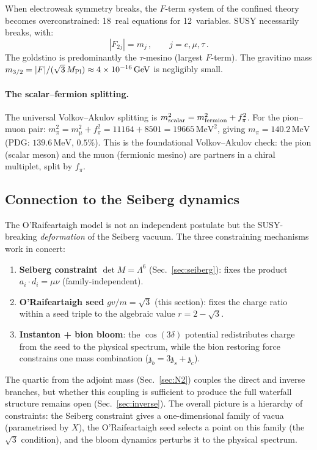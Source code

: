 \documentclass[aps,prd,twocolumn,showpacs,preprintnumbers,superscriptaddress,floatfix]{revtex4-2}
\newcommand{\MeV}{\,\mathrm{MeV}}
\newcommand{\GeV}{\,\mathrm{GeV}}
\newcommand{\zch}{\mathfrak{z}}
\begin{document}
When electroweak symmetry breaks, the $F$-term system of the
confined theory becomes overconstrained: 18~real equations for
12~variables.
SUSY necessarily breaks, with:
\begin{equation}
  |F_{2j}| = m_j\,,\qquad j = e, \mu, \tau\,.
  \label{eq:Fterms_leptons}
\end{equation}
The goldstino is predominantly the $\tau$-mesino (largest
$F$-term).
The gravitino mass
$m_{3/2} = |F|/(\sqrt{3}\,M_{\rm Pl})
\approx 4 \times 10^{-16}\GeV$
is negligibly small.

\paragraph{The scalar--fermion splitting.}
The universal Volkov--Akulov splitting is
$m^2_{\rm scalar} = m^2_{\rm fermion} + f_\pi^2$.
For the pion--muon pair:
$m_\pi^2 = m_\mu^2 + f_\pi^2 = 11164 + 8501 = 19665\MeV^2$,
giving $m_\pi = 140.2\MeV$ (PDG: $139.6\MeV$, $0.5\%$).
This is the foundational Volkov--Akulov check: the pion (scalar
meson) and the muon (fermionic mesino) are partners in a chiral
multiplet, split by $f_\pi$.


\subsection{Connection to the Seiberg dynamics}

The O'Raifeartaigh model is not an independent postulate but the
SUSY-breaking \emph{deformation} of the Seiberg vacuum.
The three constraining mechanisms work in concert:
\begin{enumerate}
  \item \textbf{Seiberg constraint} $\det M = \Lambda^6$
    (Sec.~\ref{sec:seiberg}): fixes the product
    $a_i \cdot d_i = \mu\nu$ (family-independent).
  \item \textbf{O'Raifeartaigh seed} $gv/m = \sqrt{3}$
    (this section): fixes the charge ratio within a seed triple
    to the algebraic value $r = 2 - \sqrt{3}$.
  \item \textbf{Instanton + bion bloom}: the $\cos(3\delta)$
    potential redistributes charge from the seed to the physical
    spectrum, while the bion restoring force constrains one mass
    combination ($\zch_b = 3\zch_s + \zch_c$).
\end{enumerate}
The quartic from the adjoint mass (Sec.~\ref{sec:N2}) couples
the direct and inverse branches, but whether this coupling is
sufficient to produce the full waterfall structure remains
open (Sec.~\ref{sec:inverse}).
The overall picture is a hierarchy of constraints: the Seiberg
constraint gives a one-dimensional family of vacua (parametrised
by $X$), the O'Raifeartaigh seed selects a point on this family
(the $\sqrt{3}$ condition), and the bloom dynamics perturbs it
to the physical spectrum.
\end{document}
